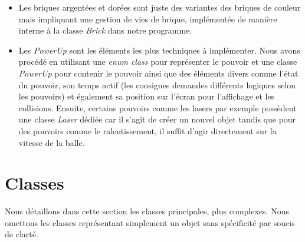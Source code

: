 \documentclass[utf8]{article}
\begin{document}
\begin{itemize}
    \item Les briques argentées et dorées sont juste des variantes des briques de couleur mais impliquant une gestion de vies de brique, implémentée de manière interne à la classe \emph{Brick} dans notre programme.
    \item Les \emph{PowerUp} sont les éléments les plus techniques à implémenter. Nous avons procédé en utilisant une \emph{enum class} pour représenter le pouvoir et une classe \emph{PowerUp} pour contenir le pouvoir ainsi que des éléments divers comme l'état du pouvoir, son temps actif (les consignes demandes différents logiques selon les pouvoirs) et également sa position sur l'écran pour l'affichage et les collisions. Ensuite, certains pouvoirs comme les lasers par exemple possèdent une classe \emph{Laser} dédiée car il s'agit de créer un nouvel objet tandis que pour des pouvoirs comme le ralentissement, il suffit d'agir directement sur la vitesse de la balle.
\end{itemize}

\section{Classes}
Nous détaillons dans cette section les classes principales, plus complexes. Nous omettons les classes représentant simplement un objet sans spécificité par soucis de clarté.
\end{document}

